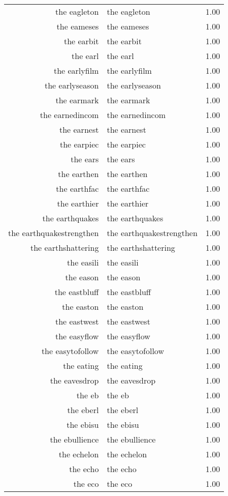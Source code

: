 \begin{table}[ht]
\begin{tabular}{rlr}
  the eagleton & the eagleton & 1.00 \\ 
  the eameses & the eameses & 1.00 \\ 
  the earbit & the earbit & 1.00 \\ 
  the earl & the earl & 1.00 \\ 
  the earlyfilm & the earlyfilm & 1.00 \\ 
  the earlyseason & the earlyseason & 1.00 \\ 
  the earmark & the earmark & 1.00 \\ 
  the earnedincom & the earnedincom & 1.00 \\ 
  the earnest & the earnest & 1.00 \\ 
  the earpiec & the earpiec & 1.00 \\ 
  the ears & the ears & 1.00 \\ 
  the earthen & the earthen & 1.00 \\ 
  the earthfac & the earthfac & 1.00 \\ 
  the earthier & the earthier & 1.00 \\ 
  the earthquakes & the earthquakes & 1.00 \\ 
  the earthquakestrengthen & the earthquakestrengthen & 1.00 \\ 
  the earthshattering & the earthshattering & 1.00 \\ 
  the easili & the easili & 1.00 \\ 
  the eason & the eason & 1.00 \\ 
  the eastbluff & the eastbluff & 1.00 \\ 
  the easton & the easton & 1.00 \\ 
  the eastwest & the eastwest & 1.00 \\ 
  the easyflow & the easyflow & 1.00 \\ 
  the easytofollow & the easytofollow & 1.00 \\ 
  the eating & the eating & 1.00 \\ 
  the eavesdrop & the eavesdrop & 1.00 \\ 
  the eb & the eb & 1.00 \\ 
  the eberl & the eberl & 1.00 \\ 
  the ebisu & the ebisu & 1.00 \\ 
  the ebullience & the ebullience & 1.00 \\ 
  the echelon & the echelon & 1.00 \\ 
  the echo & the echo & 1.00 \\ 
  the eco & the eco & 1.00 \\ 

\end{tabular}
\end{table}
